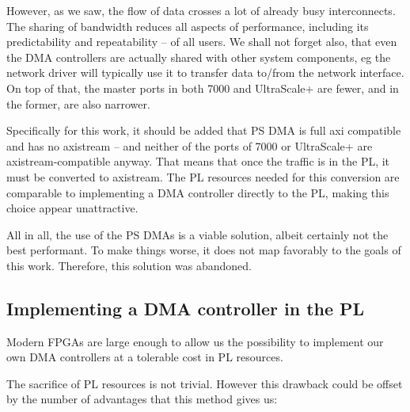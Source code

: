 However, as we saw, the flow of data crosses a lot of already busy interconnects.
The sharing of bandwidth reduces all aspects of performance, 
including its predictability and repeatability -- of all users.
We shall not forget also, that even the DMA controllers are actually shared with
other system components, eg the network driver will typically use it to transfer data
to/from the network interface. On top of that, the master ports in both 7000 and UltraScale+
are fewer, and in the former, are also narrower.

Specifically for this work, it should be added that PS DMA is full \gls{axi} compatible
and has no \gls{axistream} -- and neither of the ports of 7000 or UltraScale+ are 
\gls{axistream}-compatible anyway. That means that once the traffic is in the PL,
it must be converted to \gls{axistream}. 
The PL resources needed for this conversion are comparable to implementing a DMA
controller directly to the PL, making this choice appear unattractive.

All in all, the use of the PS DMAs is a viable solution, 
albeit certainly not the best performant. 
To make things worse, it does not map favorably to the goals of this work.
Therefore, this solution was abandoned.

\subsection{Implementing a DMA controller in the PL}

Modern FPGAs are large enough to allow us 
the possibility to implement our own DMA controllers 
at a tolerable cost in PL resources. 

The sacrifice of PL resources is not trivial.
However this drawback could be offset by the number of
advantages that this method gives us:

